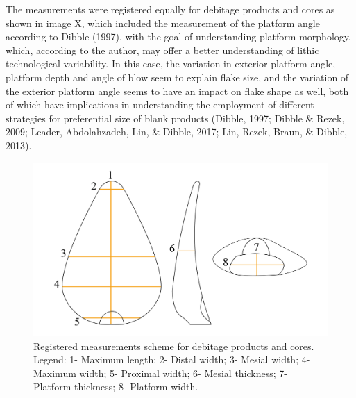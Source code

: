 \documentclass[12pt,twoside]{reedthesis}
\begin{document}
The measurements were registered equally for debitage products and cores as shown in image X, which included the measurement of the platform angle according to Dibble (1997), with the goal of understanding platform morphology, which, according to the author, may offer a better understanding of lithic technological variability. In this case, the variation in exterior platform angle, platform depth and angle of blow seem to explain flake size, and the variation of the exterior platform angle seems to have an impact on flake shape as well, both of which have implications in understanding the employment of different strategies for preferential size of blank products (Dibble, 1997; Dibble \& Rezek, 2009; Leader, Abdolahzadeh, Lin, \& Dibble, 2017; Lin, Rezek, Braun, \& Dibble, 2013).
\begin{figure}
\includegraphics[width=1\linewidth]{figure/Metrics-01} \caption{Registered measurements scheme for debitage products and cores. Legend: 1- Maximum length; 2- Distal width; 3- Mesial width; 4- Maximum width; 5- Proximal width; 6- Mesial thickness; 7- Platform thickness; 8- Platform width.}\label{fig:unnamed-chunk-10}
\end{figure}
\end{document}
